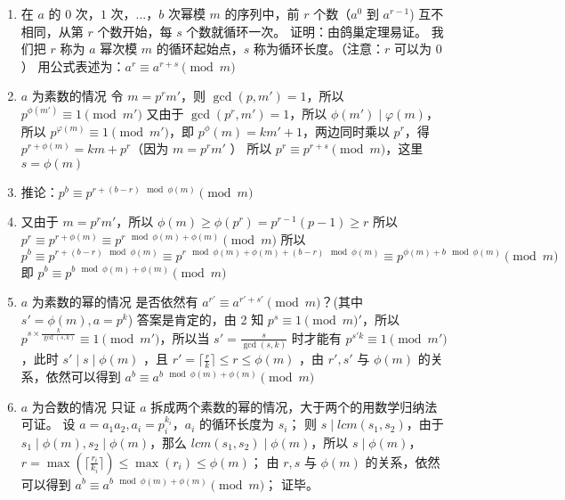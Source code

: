 \begin{enumerate}
\item 在 $a$ 的 $0$ 次，$1$ 次，...，$b$ 次幂模 $m$ 的序列中，前 $r$ 个数（$a^0$ 到 $a^{r-1}$) 互不相同，从第 $r$ 个数开始，每 $s$ 个数就循环一次。
证明：由鸽巢定理易证。
我们把 $r$ 称为 $a$ 幂次模 $m$ 的循环起始点，$s$ 称为循环长度。（注意：$r$ 可以为 $0$）
用公式表述为：$a^r\equiv a^{r+s}\pmod{m}$ 
\item $a$ 为素数的情况
令 $m=p^rm'$，则 $\gcd(p,m')=1$，所以 $p^{\phi(m')}\equiv 1\pmod{m'}$ 
又由于 $\gcd(p^r,m')=1$，所以 $\phi(m') \mid \varphi(m)$，所以 $p^{\varphi(m)}\equiv 1 \pmod {m'}$，即 $p^\phi(m)=km'+1$，两边同时乘以 $p^r$，得 $p^{r+\phi(m)}=km+p^r$（因为 $m=p^rm'$ ）
所以 $p^r\equiv p^{r+s}\pmod m$，这里 $s=\phi(m)$
\item 推论：$p^b\equiv p^{r+(b-r) \mod \phi(m)}\pmod m$ 
\item 又由于 $m=p^rm'$，所以 $\phi(m) \ge  \phi(p^r)=p^{r-1}(p-1) \ge r$ 
所以 $p^r\equiv p^{r+\phi(m)}\equiv p^{r \mod \phi(m)+\phi(m)}\pmod m$ 
所以 $p^b\equiv p^{r+(b-r) \mod \phi(m)}\equiv p^{r \mod \phi(m)+\phi(m)+(b-r) \mod \phi(m)}\equiv p^{\phi(m)+b \mod \phi(m)}\pmod m$ 
即 $p^b\equiv p^{b \mod \phi(m)+\phi(m)}\pmod m$ 
\item $a$ 为素数的幂的情况
是否依然有 $a^{r'}\equiv a^{r'+s'}\pmod m$？(其中 $s'=\phi(m),a=p^k$)
答案是肯定的，由 2 知 $p^s\equiv 1 \pmod m'$，所以 $p^{s \times \frac{k}{\gcd(s,k)}} \equiv 1\pmod {m'}$，所以当 $s'=\frac{s}{\gcd(s,k)}$ 时才能有 $p^{s'k}\equiv 1\pmod {m'}$ ，此时 $s' \mid s \mid \phi(m)$ ，且 $r'= \lceil \frac{r}{k}\rceil \le r \le \phi(m)$ ，由 $r',s'$ 与 $\phi(m)$ 的关系，依然可以得到 $a^b\equiv a^{b \mod \phi(m)+\phi(m)}\pmod m$
\item $a$ 为合数的情况
只证 $a$ 拆成两个素数的幂的情况，大于两个的用数学归纳法可证。
设 $a=a_1a_2,a_i=p_i^{k_i}$，$a_i$ 的循环长度为 $s_i$；
则 $s \mid lcm(s_1,s_2)$，由于 $s_1 \mid \phi(m),s_2 \mid \phi(m)$，那么 $lcm(s_1,s_2) \mid \phi(m)$，所以 $s \mid \phi(m)$， $r=\max(\lceil \frac{r_i}{k_i} \rceil) \le \max(r_i) \le \phi(m)$；
由 $r,s$ 与 $\phi(m)$ 的关系，依然可以得到 $a^b\equiv a^{b \mod \phi(m)+\phi(m)}\pmod m$；
证毕。
\end{enumerate}
